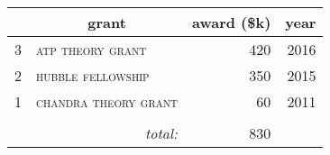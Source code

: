 \begin{tabular}{rlrr}

\toprule & \multicolumn{1}{c}{grant} & \multicolumn{1}{c}{award (\$k)}  & \multicolumn{1}{c}{year}
\\ \midrule

3  &  \textsc{\MakeTextLowercase{ATP Theory Grant}}  &  420  &  2016\\

2  &  \textsc{\MakeTextLowercase{Hubble Fellowship}}  &  350  &  2015\\

1  &  \textsc{\MakeTextLowercase{Chandra Theory Grant}}  &  60  &  2011\\

\\[-0.5ex] \multicolumn{2}{r}{\textit{total:}} & 830 & \\
\bottomrule\end{tabular}
